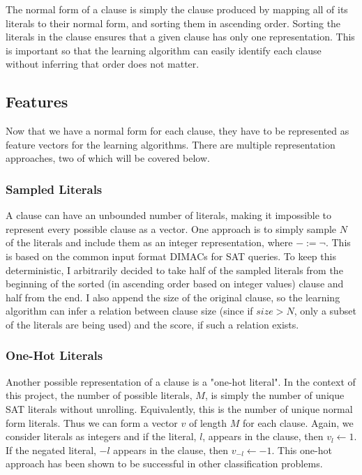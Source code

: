 \documentclass[letterpaper]{article} %
\begin{document}
The normal form of a clause is simply the clause produced by mapping all of its literals to their normal form, and sorting them in ascending order. Sorting the literals in the clause ensures that a given clause has only one representation. This is important so that the learning algorithm can easily identify each clause without inferring that order does not matter.

\subsection{Features}

Now that we have a normal form for each clause, they have to be represented as feature vectors for the learning algorithms. There are multiple representation approaches, two of which will be covered below.

\subsubsection{Sampled Literals}

A clause can have an unbounded number of literals, making it impossible to represent every possible clause as a vector. One approach is to simply sample $N$ of the literals and include them as an integer representation, where $- := \neg$. This is based on the common input format DIMACs for SAT queries. To keep this deterministic, I arbitrarily decided to take half of the sampled literals from the beginning of the sorted (in ascending order based on integer values) clause and half from the end. I also append the size of the original clause, so the learning algorithm can infer a relation between clause size (since if $size > N$, only a subset of the literals are being used) and the score, if such a relation exists.

\subsubsection{One-Hot Literals}

Another possible representation of a clause is a "one-hot literal". In the context of this project, the number of possible literals, $M$, is simply the number of unique SAT literals without unrolling. Equivalently, this is the number of unique normal form literals. Thus we can form a vector $v$ of length $M$ for each clause. Again, we consider literals as integers and if the literal, $l$, appears in the clause, then $v_l \gets 1$. If the negated literal, $-l$ appears in the clause, then $v_{-l} \gets -1$. This one-hot approach has been shown to be successful in other classification problems.
\end{document}
